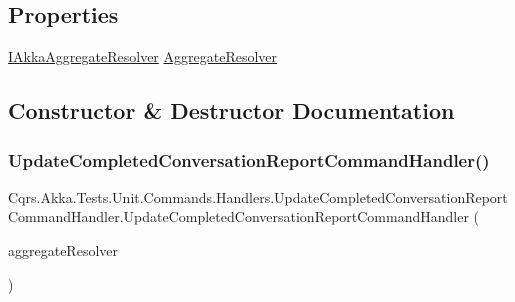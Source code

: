 \subsection*{Properties}
\begin{DoxyCompactItemize}
\item 
\hyperlink{interfaceCqrs_1_1Akka_1_1Domain_1_1IAkkaAggregateResolver}{I\+Akka\+Aggregate\+Resolver} \hyperlink{classCqrs_1_1Akka_1_1Tests_1_1Unit_1_1Commands_1_1Handlers_1_1UpdateCompletedConversationReportCommandHandler_af5cde3b1fadb7cb1962301a67aa9339b_af5cde3b1fadb7cb1962301a67aa9339b}{Aggregate\+Resolver}
\end{DoxyCompactItemize}


\subsection{Constructor \& Destructor Documentation}
\mbox{\label{classCqrs_1_1Akka_1_1Tests_1_1Unit_1_1Commands_1_1Handlers_1_1UpdateCompletedConversationReportCommandHandler_a816316549866b3e4abb410a7b9ea06a3_a816316549866b3e4abb410a7b9ea06a3}} 
\subsubsection{\texorpdfstring{Update\+Completed\+Conversation\+Report\+Command\+Handler()}{UpdateCompletedConversationReportCommandHandler()}}
{\footnotesize\ttfamily Cqrs.\+Akka.\+Tests.\+Unit.\+Commands.\+Handlers.\+Update\+Completed\+Conversation\+Report\+Command\+Handler.\+Update\+Completed\+Conversation\+Report\+Command\+Handler (\begin{DoxyParamCaption}\item[{\hyperlink{interfaceCqrs_1_1Akka_1_1Domain_1_1IAkkaAggregateResolver}{I\+Akka\+Aggregate\+Resolver}}]{aggregate\+Resolver }\end{DoxyParamCaption})}



